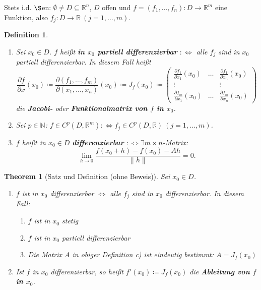 \documentclass[12pt]{extreport} %
\newcommand{\N}{\mathbb{N}}
\newcommand{\R}{\mathbb{R}}
\theoremstyle{named}
\newtheorem{unnamedtheorem}{Theorem} \counterwithin{unnamedtheorem}{chapter}
\theoremstyle{nnamed}
\theoremstyle{itshape}
\newtheorem*{definition}{Definition}
\theoremstyle{normal}
\begin{document}
Stets i.d. $\S$en: $\emptyset \neq D \subseteq \R^{n}$, $D$ offen und $f = (f_{1}, \dotsc, f_{n}) \colon D \rightarrow \R^{m}$ eine Funktion, also $f_{j} \colon D \rightarrow \R ~(j =1, \dotsc, m)$.

    
\begin{definition} ~\
	\begin{enumerate}
		\item Sei $x_{0} \in D$. $f$ hei{\ss}t \textbf{in $x_{0}$ partiell differenzierbar} $:\iff$ alle $f_{j}$ sind in $x_{0}$ partiell differenzierbar. In diesem Fall hei{\ss}t
			$$ \frac{\partial f}{\partial x}(x_{0}) \coloneqq \frac{\partial \left( f_{1}, \dotsc, f_{m}\right)}{\partial \left( x_{1}, \dotsc, x_{n} \right)} (x_{0}) \coloneqq J_{f}(x_{0}) \coloneqq \begin{pmatrix} \frac{\partial f_{1}}{\partial x_{1}}(x_{0}) & \dotsc & \frac{\partial f_{1}}{\partial x_{n}}(x_{0}) \\ \vdots & ~& \vdots \\ \frac{\partial f_{m}}{\partial x_{1}}(x_{0}) & \dotsc & \frac{\partial f_{m}}{\partial x_{n}}(x_{0}) \end{pmatrix} $$
			die \textbf{Jacobi-} oder \textbf{Funktionalmatrix von $f$ in $x_{0}$}.
		\item Sei $p \in \N$: $f \in C^{p}(D, \R^{m}) :\iff f_{j} \in C^{p}(D, \R) ~(j = 1, \dotsc, m)$.
		\item $f$ hei{\ss}t in $x_{0} \in D$ \textbf{differenzierbar} $:\iff \exists m \times n$-Matrix:
			$$ \lim_{h \rightarrow 0} \frac{f(x_{0} + h) - f(x_{0}) - Ah}{\|h\|} = 0. $$
	\end{enumerate}
\end{definition}

\begin{unnamedtheorem}[Satz und Definition (ohne Beweis)] \label{19.1:satz}
	Sei $x_{0} \in D$.
	\begin{enumerate}
		\item $f$ ist in $x_{0}$ differenzierbar $\iff$ alle $f_{j}$ sind in $x_{0}$ differenzierbar. In diesem Fall:
			\begin{enumerate}
				\item $f$ ist in $x_{0}$ stetig
				\item $f$ ist in $x_{0}$ partiell differenzierbar
				\item Die Matrix $A$ in obiger Definition c) ist eindeutig bestimmt: $A = J_{f}(x_{0})$
			\end{enumerate}
		\item Ist $f$ in $x_{0}$ differenzierbar, so hei{\ss}t $f'(x_{0}) \coloneqq J_{f}(x_{0})$ die \textbf{Ableitung von $f$ in $x_{0}$}.
	\end{enumerate}
\end{unnamedtheorem}
\end{document}
